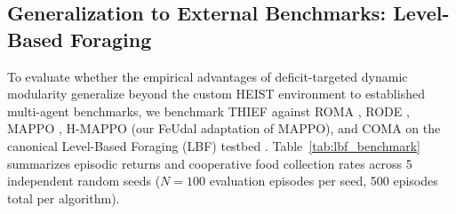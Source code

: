 \FloatBarrier
\subsection{Generalization to External Benchmarks: Level-Based Foraging}
\label{sec:results_lbf}

To evaluate whether the empirical advantages of deficit-targeted dynamic modularity generalize beyond the custom HEIST environment to established multi-agent benchmarks, we benchmark THIEF against ROMA \citep{wang2020roma}, RODE \citep{wang2021rode}, MAPPO \citep{yu2022surprising}, H-MAPPO (our FeUdal \citep{vezhnevets2017feudal} adaptation of MAPPO), and COMA \citep{foerster2018counterfactual} on the canonical Level-Based Foraging (LBF) testbed \citep{papoudakis2021benchmarking}. Table~\ref{tab:lbf_benchmark} summarizes episodic returns and cooperative food collection rates across 5 independent random seeds ($N=100$ evaluation episodes per seed, 500 episodes total per algorithm).



